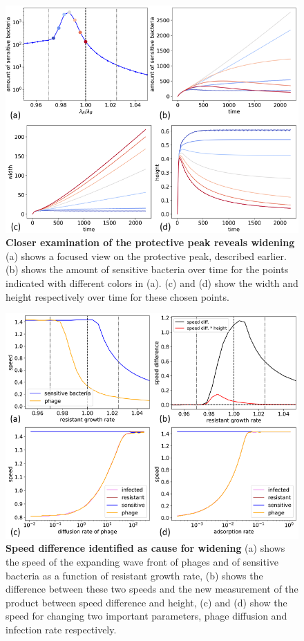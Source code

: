 \begin{figure}
\centering
\includegraphics[width=\linewidth]{graphics/2025_09_29_phages_fig5.png}
\caption{\textbf{Closer examination of the protective peak reveals widening} (a) shows a focused view on the protective peak, described earlier. (b) shows the amount of sensitive bacteria over time for the points indicated with different colors in (a). (c) and (d) show the width and height respectively over time for these chosen points.}
\label{fig:results_peak_change_height_width}
\end{figure}

\begin{figure}
\centering
\includegraphics[width=\linewidth]{graphics/2025_09_26_phages_fig4.png}
\caption{\textbf{Speed difference identified as cause for widening} (a) shows the speed of the expanding wave front of phages and of sensitive bacteria as a function of resistant growth rate, (b) shows the difference between these two speeds and the new measurement of the product between speed difference and height, (c) and (d) show the speed for changing two important parameters, phage diffusion and infection rate respectively.}
\label{fig:results_speed_height}
\end{figure}

